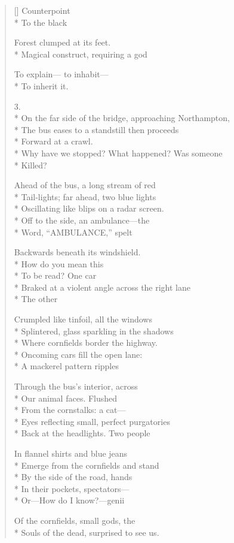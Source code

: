 \begin{verse}[\versewidth]
Counterpoint\\*
To the black

Forest clumped at its feet.\\*
Magical construct, requiring a god

To explain---     to inhabit--- \\*
To inherit it.

3.\\*
On the far side of the bridge, approaching Northampton,\\*
The bus eases to a standstill    then proceeds\\*
Forward at a crawl.\\*
Why have we stopped?   What happened?   Was someone\\*
Killed?

Ahead of the bus, a long stream of red\\*
Tail-lights; far ahead, two blue lights\\*
Oscillating like blips on a radar screen.\\*
Off to the side, an ambulance---the \\*
Word, ``AMBULANCE,'' spelt

 Backwards beneath its windshield.\\*
How do you mean this \\*
To be read?     One car\\*
Braked at a violent angle across the right lane\\*
The other

Crumpled like tinfoil, all the windows\\*
Splintered, glass sparkling in the shadows\\*
Where cornfields border the highway.\\*
Oncoming cars fill the open lane: \\*
A mackerel pattern ripples 

Through the bus's interior, across\\*
Our animal faces.     Flushed\\*
From the cornstalks: a cat---\\*
Eyes reflecting small, perfect purgatories\\*
Back at the headlights.  Two people

In flannel shirts and blue jeans\\*
Emerge from the cornfields and stand\\*
By the side of the road, hands\\*
In their pockets, spectators---\\*
Or---How do I know?---genii 

Of the cornfields, small gods, the\\*
Souls of the dead, surprised to see us.
\end{verse}
